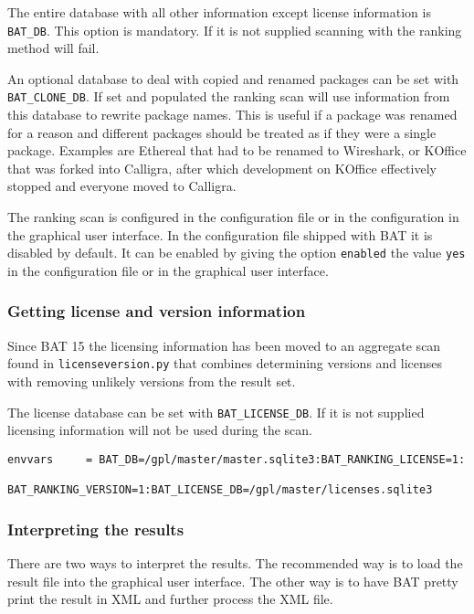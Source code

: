 \documentclass[10pt]{article}
\begin{document}
The entire database with all other information except license information is
\texttt{BAT\_DB}. This option is mandatory. If it is not supplied scanning with
the ranking method will fail.

An optional database to deal with copied and renamed packages can be set with
\texttt{BAT\_CLONE\_DB}. If set and populated the ranking scan will use
information from this database to rewrite package names. This is useful if a
package was renamed for a reason and different packages should be treated as if
they were a single package. Examples are Ethereal that had to be renamed to
Wireshark, or KOffice that was forked into Calligra, after which development
on KOffice effectively stopped and everyone moved to Calligra.

The ranking scan is configured in the configuration file or in the
configuration in the graphical user interface. In the configuration file
shipped with BAT it is disabled by default. It can be enabled by giving the
option \texttt{enabled} the value \texttt{yes} in the configuration file or
in the graphical user interface.

\subsubsection{Getting license and version information}

Since BAT 15 the licensing information has been moved to an aggregate scan
found in \texttt{licenseversion.py} that combines determining versions and
licenses with removing unlikely versions from the result set.

The license database can be set with \texttt{BAT\_LICENSE\_DB}. If it is not
supplied licensing information will not be used during the scan.

\begin{verbatim}
envvars     = BAT_DB=/gpl/master/master.sqlite3:BAT_RANKING_LICENSE=1:
              BAT_RANKING_VERSION=1:BAT_LICENSE_DB=/gpl/master/licenses.sqlite3
\end{verbatim}

\subsubsection{Interpreting the results}

There are two ways to interpret the results. The recommended way is to load the
result file into the graphical user interface. The other way is to have BAT
pretty print the result in XML and further process the XML file.
\end{document}
